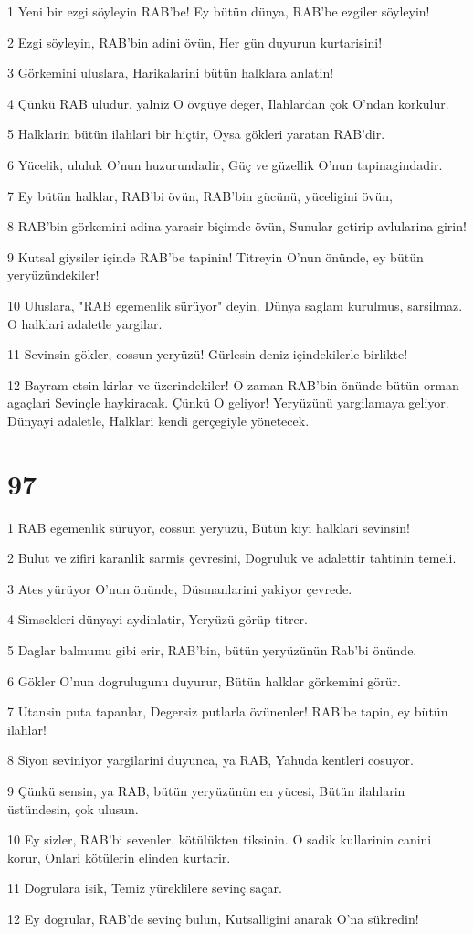 \par 1 Yeni bir ezgi söyleyin RAB'be! Ey bütün dünya, RAB'be ezgiler söyleyin!
\par 2 Ezgi söyleyin, RAB'bin adini övün, Her gün duyurun kurtarisini!
\par 3 Görkemini uluslara, Harikalarini bütün halklara anlatin!
\par 4 Çünkü RAB uludur, yalniz O övgüye deger, Ilahlardan çok O'ndan korkulur.
\par 5 Halklarin bütün ilahlari bir hiçtir, Oysa gökleri yaratan RAB'dir.
\par 6 Yücelik, ululuk O'nun huzurundadir, Güç ve güzellik O'nun tapinagindadir.
\par 7 Ey bütün halklar, RAB'bi övün, RAB'bin gücünü, yüceligini övün,
\par 8 RAB'bin görkemini adina yarasir biçimde övün, Sunular getirip avlularina girin!
\par 9 Kutsal giysiler içinde RAB'be tapinin! Titreyin O'nun önünde, ey bütün yeryüzündekiler!
\par 10 Uluslara, "RAB egemenlik sürüyor" deyin. Dünya saglam kurulmus, sarsilmaz. O halklari adaletle yargilar.
\par 11 Sevinsin gökler, cossun yeryüzü! Gürlesin deniz içindekilerle birlikte!
\par 12 Bayram etsin kirlar ve üzerindekiler! O zaman RAB'bin önünde bütün orman agaçlari Sevinçle haykiracak. Çünkü O geliyor! Yeryüzünü yargilamaya geliyor. Dünyayi adaletle, Halklari kendi gerçegiyle yönetecek.

\chapter{97}

\par 1 RAB egemenlik sürüyor, cossun yeryüzü, Bütün kiyi halklari sevinsin!
\par 2 Bulut ve zifiri karanlik sarmis çevresini, Dogruluk ve adalettir tahtinin temeli.
\par 3 Ates yürüyor O'nun önünde, Düsmanlarini yakiyor çevrede.
\par 4 Simsekleri dünyayi aydinlatir, Yeryüzü görüp titrer.
\par 5 Daglar balmumu gibi erir, RAB'bin, bütün yeryüzünün Rab'bi önünde.
\par 6 Gökler O'nun dogrulugunu duyurur, Bütün halklar görkemini görür.
\par 7 Utansin puta tapanlar, Degersiz putlarla övünenler! RAB'be tapin, ey bütün ilahlar!
\par 8 Siyon seviniyor yargilarini duyunca, ya RAB, Yahuda kentleri cosuyor.
\par 9 Çünkü sensin, ya RAB, bütün yeryüzünün en yücesi, Bütün ilahlarin üstündesin, çok ulusun.
\par 10 Ey sizler, RAB'bi sevenler, kötülükten tiksinin. O sadik kullarinin canini korur, Onlari kötülerin elinden kurtarir.
\par 11 Dogrulara isik, Temiz yüreklilere sevinç saçar.
\par 12 Ey dogrular, RAB'de sevinç bulun, Kutsalligini anarak O'na sükredin!

